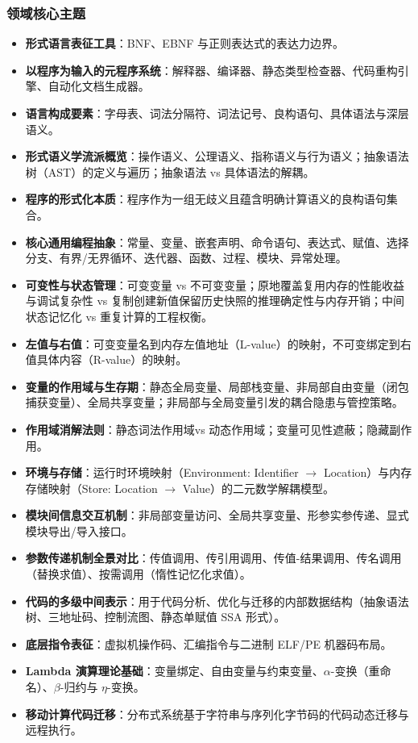 \subsubsection{领域核心主题}
\begin{itemize}
    \item \textbf{形式语言表征工具}：BNF、EBNF 与正则表达式的表达力边界。
    \item \textbf{以程序为输入的元程序系统}：解释器、编译器、静态类型检查器、代码重构引擎、自动化文档生成器。
    \item \textbf{语言构成要素}：字母表、词法分隔符、词法记号、良构语句、具体语法与深层语义。
    \item \textbf{形式语义学流派概览}：操作语义、公理语义、指称语义与行为语义；抽象语法树（AST）的定义与遍历；抽象语法 vs 具体语法的解耦。
    \item \textbf{程序的形式化本质}：程序作为一组无歧义且蕴含明确计算语义的良构语句集合。
    \item \textbf{核心通用编程抽象}：常量、变量、嵌套声明、命令语句、表达式、赋值、选择分支、有界/无界循环、迭代器、函数、过程、模块、异常处理。
    \item \textbf{可变性与状态管理}：可变变量 vs 不可变变量；原地覆盖复用内存的性能收益与调试复杂性 vs 复制创建新值保留历史快照的推理确定性与内存开销；中间状态记忆化 vs 重复计算的工程权衡。
    \item \textbf{左值与右值}：可变变量名到内存左值地址（L-value）的映射，不可变绑定到右值具体内容（R-value）的映射。
    \item \textbf{变量的作用域与生存期}：静态全局变量、局部栈变量、非局部自由变量（闭包捕获变量）、全局共享变量；非局部与全局变量引发的耦合隐患与管控策略。
    \item \textbf{作用域消解法则}：静态词法作用域vs 动态作用域；变量可见性遮蔽；隐藏副作用。
    \item \textbf{环境与存储}：运行时环境映射（Environment: Identifier $\to$ Location）与内存存储映射（Store: Location $\to$ Value）的二元数学解耦模型。
    \item \textbf{模块间信息交互机制}：非局部变量访问、全局共享变量、形参实参传递、显式模块导出/导入接口。
    \item \textbf{参数传递机制全景对比}：传值调用、传引用调用、传值-结果调用、传名调用（替换求值）、按需调用（惰性记忆化求值）。
    \item \textbf{代码的多级中间表示}：用于代码分析、优化与迁移的内部数据结构（抽象语法树、三地址码、控制流图、静态单赋值 SSA 形式）。
    \item \textbf{底层指令表征}：虚拟机操作码、汇编指令与二进制 ELF/PE 机器码布局。
    \item \textbf{Lambda 演算理论基础}：变量绑定、自由变量与约束变量、$\alpha$-变换（重命名）、$\beta$-归约与 $\eta$-变换。
    \item \textbf{移动计算代码迁移}：分布式系统基于字符串与序列化字节码的代码动态迁移与远程执行。
\end{itemize}

